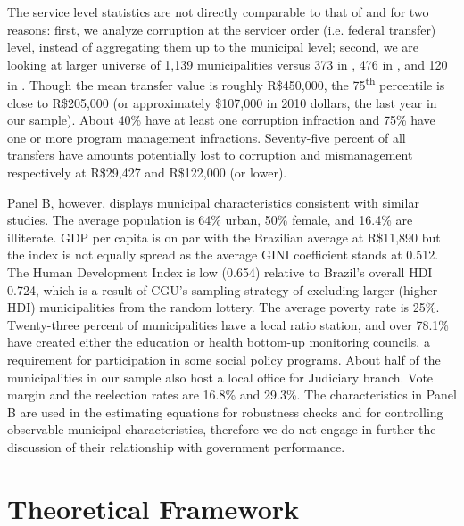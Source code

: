 \documentclass[11pt]{article}
\begin{document}
The service level statistics are not directly comparable to that of \citet{FerrazExposingCorruptPoliticians2008b,FerrazElectoralAccountabilityCorruption2011a} and \citet{ZamboniAuditRiskRent2018} for two reasons: first, we analyze corruption at the servicer order (i.e. federal transfer) level, instead of aggregating them up to the municipal level; second, we are looking at larger universe of 1,139 municipalities versus 373 in \citet{FerrazExposingCorruptPoliticians2008b}, 476 in \citet{FerrazElectoralAccountabilityCorruption2011a}, and 120 in \citet{ZamboniAuditRiskRent2018}. Though the mean transfer value is roughly R\$450,000, the 75\textsuperscript{th} percentile is close to R\$205,000 (or approximately \$107,000 in 2010 dollars, the last year in our sample). About 40\% have at least one corruption infraction and 75\% have one or more program management infractions. Seventy-five percent of all transfers have amounts potentially lost to corruption and mismanagement respectively at R\$29,427 and R\$122,000 (or lower).



Panel B, however, displays municipal characteristics consistent with similar studies. The average population is 64\% urban, 50\% female, and 16.4\% are illiterate. GDP per capita is on par with the Brazilian average at R\$11,890 but the index is not equally spread as the average GINI coefficient stands at 0.512. The Human Development Index is low (0.654) relative to Brazil's overall HDI 0.724, which is a result of CGU's sampling strategy of excluding larger (higher HDI) municipalities from the random lottery. The average poverty rate is 25\%. Twenty-three percent of municipalities have a local ratio station, and over 78.1\% have created either the education or health bottom-up monitoring councils, a requirement for participation in some social policy programs. About half of the municipalities in our sample also host a local office for Judiciary branch. Vote margin and the reelection rates are 16.8\% and 29.3\%. The characteristics in Panel B are used in the estimating equations for robustness checks and for controlling observable municipal characteristics, therefore we do not engage in further the discussion of their relationship with government performance.

\section{Theoretical Framework} \label{sec:theory}
\end{document}
